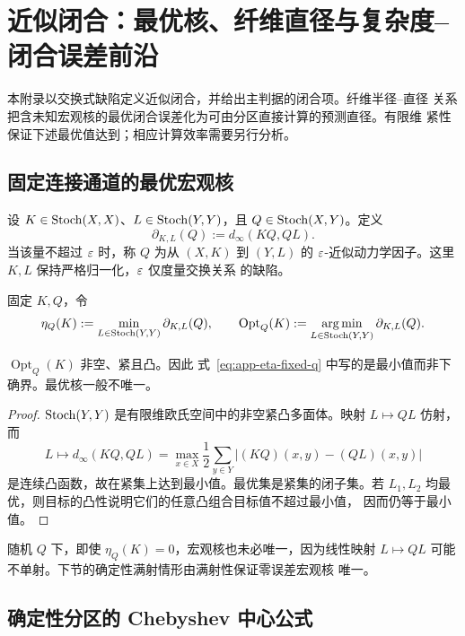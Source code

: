 \section{近似闭合：最优核、纤维直径与复杂度--闭合误差前沿}
\label{app:approximate-theory}

本附录以交换式缺陷定义近似闭合，并给出主判据的闭合项。纤维半径--直径
关系把含未知宏观核的最优闭合误差化为可由分区直接计算的预测直径。有限维
紧性保证下述最优值达到；相应计算效率需要另行分析。

\subsection{固定连接通道的最优宏观核}

设 $K\in\operatorname{Stoch}(X,X)$、$L\in\operatorname{Stoch}(Y,Y)$，且
$Q\in\operatorname{Stoch}(X,Y)$。定义
\begin{equation}
  \partial_{K,L}(Q):=d_\infty(KQ,QL).
  \label{eq:app-factor-defect}
\end{equation}
当该量不超过 $\varepsilon$ 时，称 $Q$ 为从 $(X,K)$ 到 $(Y,L)$ 的
$\varepsilon$-近似动力学因子。这里 $K,L$ 保持严格归一化，$\varepsilon$ 仅度量交换关系
的缺陷。

固定 $K,Q$，令
\begin{equation}
  \eta_Q(K)
  :=\min_{L\in\operatorname{Stoch}(Y,Y)}\partial_{K,L}(Q),
  \qquad
  \operatorname{Opt}_Q(K)
  :=\operatorname*{arg\,min}_{L\in\operatorname{Stoch}(Y,Y)}\partial_{K,L}(Q).
  \label{eq:app-eta-fixed-q}
\end{equation}

\begin{theorem}[有限空间上的最优核达到]
\label{thm:app-optimal-kernel}
$\operatorname{Opt}_Q(K)$ 非空、紧且凸。因此
式~\eqref{eq:app-eta-fixed-q} 中写的是最小值而非下确界。最优核一般不唯一。
\end{theorem}

\begin{proof}
$\operatorname{Stoch}(Y,Y)$ 是有限维欧氏空间中的非空紧凸多面体。映射
$L\mapsto QL$ 仿射，而
\[
 L\longmapsto d_\infty(KQ,QL)
 =\max_{x\in X}\frac12\sum_{y\in Y}
   |(KQ)(x,y)-(QL)(x,y)|
\]
是连续凸函数，故在紧集上达到最小值。最优集是紧集的闭子集。若
$L_1,L_2$ 均最优，则目标的凸性说明它们的任意凸组合目标值不超过最小值，
因而仍等于最小值。
\end{proof}

随机 $Q$ 下，即使 $\eta_Q(K)=0$，宏观核也未必唯一，因为线性映射
$L\mapsto QL$ 可能不单射。下节的确定性满射情形由满射性保证零误差宏观核
唯一。

\subsection{确定性分区的 Chebyshev 中心公式}

